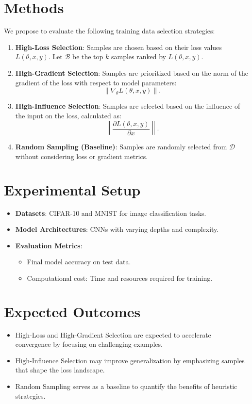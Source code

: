 \documentclass[10pt]{article}
\begin{document}
\section{Methods}
We propose to evaluate the following training data selection strategies:
\begin{enumerate}
    \item \textbf{High-Loss Selection}\cite{Loss}: Samples are chosen based on their loss values $L(\theta, x, y)$. Let $\mathcal{B}$ be the top $k$ samples ranked by $L(\theta, x, y)$.
    \item \textbf{High-Gradient Selection}\cite{Gradient}: Samples are prioritized based on the norm of the gradient of the loss with respect to model parameters:
    \[
    \|\nabla_\theta L(\theta, x, y)\|.
    \]
    \item \textbf{High-Influence Selection}\cite{Influence}: Samples are selected based on the influence of the input on the loss, calculated as:
    \[
    \left\|\frac{\partial L(\theta, x, y)}{\partial x}\right\|.
    \]
    \item \textbf{Random Sampling (Baseline)}: Samples are randomly selected from $\mathcal{D}$ without considering loss or gradient metrics.
\end{enumerate}

\section{Experimental Setup}
\begin{itemize}
    \item \textbf{Datasets}: CIFAR-10 and MNIST for image classification tasks.
    \item \textbf{Model Architectures}: CNNs with varying depths and complexity.
    \item \textbf{Evaluation Metrics}: 
    \begin{itemize}
        \item Final model accuracy on test data.
        \item Computational cost: Time and resources required for training.
    \end{itemize}
\end{itemize}

\section{Expected Outcomes}
\begin{itemize}
    \item High-Loss and High-Gradient Selection are expected to accelerate convergence by focusing on challenging examples.
    \item High-Influence Selection may improve generalization by emphasizing samples that shape the loss landscape.
    \item Random Sampling serves as a baseline to quantify the benefits of heuristic strategies.
\end{itemize}



\end{document}
